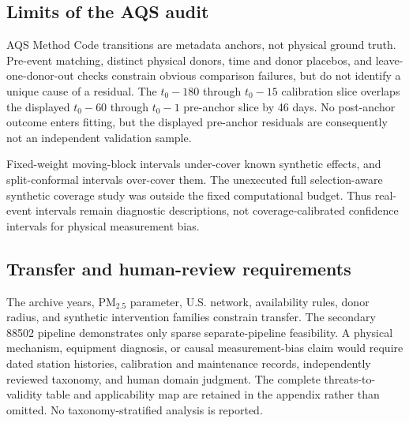 \subsection{Limits of the AQS audit}

AQS Method Code transitions are metadata anchors, not physical ground truth.
Pre-event matching, distinct physical donors, time and donor placebos, and
leave-one-donor-out checks constrain obvious comparison failures, but do not
identify a unique cause of a residual. The $t_0-180$ through $t_0-15$
calibration slice overlaps the displayed $t_0-60$ through $t_0-1$ pre-anchor
slice by 46 days. No post-anchor outcome enters fitting, but the displayed
pre-anchor residuals are consequently not an independent validation sample.

Fixed-weight moving-block intervals under-cover known synthetic effects, and
split-conformal intervals over-cover them. The unexecuted full
selection-aware synthetic coverage study was outside the fixed computational
budget. Thus real-event intervals remain diagnostic descriptions, not
coverage-calibrated confidence intervals for physical measurement bias.

\subsection{Transfer and human-review requirements}

The archive years, PM$_{2.5}$ parameter, U.S. network, availability rules,
donor radius, and synthetic intervention families constrain transfer. The
secondary 88502 pipeline demonstrates only sparse separate-pipeline
feasibility. A physical mechanism, equipment diagnosis, or causal
measurement-bias claim would require dated station histories, calibration and
maintenance records, independently reviewed taxonomy, and human domain
judgment. The complete threats-to-validity table and applicability map are
retained in the appendix rather than omitted. No taxonomy-stratified analysis
is reported.

\FloatBarrier
